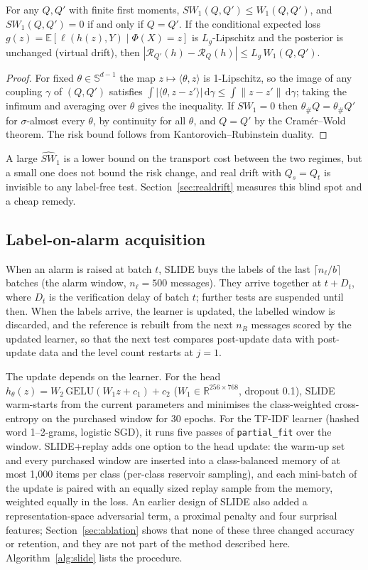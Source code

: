 \begin{proposition}\label{prop:sw}
For any $Q,Q'$ with finite first moments, $SW_1(Q,Q')\le W_1(Q,Q')$, and $SW_1(Q,Q')=0$ if and only if $Q=Q'$. If the conditional expected loss $g(z)=\mathbb{E}[\ell(h(z),Y)\mid\Phi(X)=z]$ is $L_g$-Lipschitz and the posterior is unchanged (virtual drift), then $|\mathcal{R}_{Q'}(h)-\mathcal{R}_{Q}(h)|\le L_g\,W_1(Q,Q')$.
\end{proposition}
\begin{proof}
For fixed $\theta\in\mathbb{S}^{d-1}$ the map $z\mapsto\langle\theta,z\rangle$ is 1-Lipschitz, so the image of any coupling $\gamma$ of $(Q,Q')$ satisfies $\int|\langle\theta,z-z'\rangle|\,\mathrm{d}\gamma\le\int\lVert z-z'\rVert\,\mathrm{d}\gamma$; taking the infimum and averaging over $\theta$ gives the inequality. If $SW_1=0$ then $\theta_\#Q=\theta_\#Q'$ for $\sigma$-almost every $\theta$, by continuity for all $\theta$, and $Q=Q'$ by the Cram\'er--Wold theorem. The risk bound follows from Kantorovich--Rubinstein duality.
\end{proof}
A large $\widehat{SW}_1$ is a lower bound on the transport cost between the two regimes, but a small one does not bound the risk change, and real drift with $Q_s=Q_t$ is invisible to any label-free test. Section~\ref{sec:realdrift} measures this blind spot and a cheap remedy.

\subsection{Label-on-alarm acquisition}\label{sec:policy}
When an alarm is raised at batch $t$, SLIDE buys the labels of the last $\lceil n_\ell/b\rceil$ batches (the alarm window, $n_\ell=500$ messages). They arrive together at $t+D_t$, where $D_t$ is the verification delay of batch $t$; further tests are suspended until then. When the labels arrive, the learner is updated, the labelled window is discarded, and the reference is rebuilt from the next $n_R$ messages scored by the updated learner, so that the next test compares post-update data with post-update data and the level count restarts at $j=1$.

The update depends on the learner. For the head $h_\theta(z)=W_2\,\mathrm{GELU}(W_1z+c_1)+c_2$ ($W_1\in\mathbb{R}^{256\times768}$, dropout 0.1), SLIDE warm-starts from the current parameters and minimises the class-weighted cross-entropy on the purchased window for 30 epochs. For the TF-IDF learner (hashed word 1--2-grams, logistic SGD), it runs five passes of \texttt{partial\_fit} over the window. SLIDE+replay adds one option to the head update: the warm-up set and every purchased window are inserted into a class-balanced memory of at most 1{,}000 items per class (per-class reservoir sampling), and each mini-batch of the update is paired with an equally sized replay sample from the memory, weighted equally in the loss. An earlier design of SLIDE also added a representation-space adversarial term, a proximal penalty and four surprisal features; Section~\ref{sec:ablation} shows that none of these three changed accuracy or retention, and they are not part of the method described here. Algorithm~\ref{alg:slide} lists the procedure.

